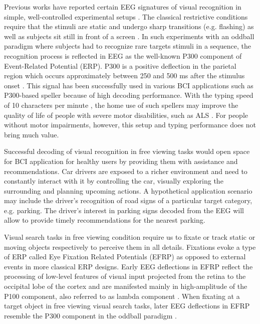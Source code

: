 \documentclass[12pt]{iopart}
\begin{document}
Previous works have reported certain EEG signatures of visual recognition in simple, well-controlled experimental setups
\cite{gerson_cortically_2006,krusienski_toward_2008,rosenthal_evoked_2014,jangraw_neurally_2014}.
The classical restrictive conditions require that
the stimuli are static and undergo sharp
transitions (e.g. flashing) as well as 
subjects sit still in front of a screen \cite{krusienski_toward_2008}. 
In such experiments with an oddball paradigm 
where subjects had to recognize
rare targets stimuli in a sequence, the recognition process
is reflected in EEG as the well-known P300 component of Event-Related Potential (ERP).
P300 is a positive deflection in the parietal region which occurs
approximately between 250 and 500 ms after the stimulus onset \cite{polich_updating_2007}.
This signal has been successfully used in various BCI applications such as
P300-based speller because of high decoding performance.
With the typing speed of 10 characters per minute \cite{rezeika_braincomputer_2018},
the home use of such spellers may improve the quality of life
of people with severe motor disabilities, such as ALS
\cite{sellers_brain-computer_2010,holz_long-term_2015,wolpaw_independent_2018}.
For people without motor impairments, however, this setup and typing performance does not bring much value.

Successful decoding of visual recognition in free viewing tasks
would open space for BCI application for healthy users
by providing them with assistance and recommendations.
Car drivers are exposed to a richer environment and need to constantly interact with it
by controlling the car, visually exploring the surrounding and
planning upcoming actions. 
A hypothetical application scenario may include
the driver's recognition of road signs of a particular target category, e.g. parking.
The driver's interest in parking signs decoded from the EEG
will allow to provide timely recommendations for the nearest parking.

Visual search tasks in free viewing condition require us to fixate or track static or moving objects respectively to perceive them in all details. Fixations evoke a type of ERP called Eye Fixation Related Potentials (EFRP)
as opposed to external events in more classical ERP designs.
Early EEG deflections in EFRP reflect the processing of low-level features 
of visual input projected from the retina to the occipital lobe of the cortex
and are manifested mainly in high-amplitude 
of the P100 component, also referred to as lambda component \cite{evans_further_1952}.
When fixating at a target object in free viewing visual search tasks, later EEG deflections in EFRP resemble the P300 component in the oddball paradigm \cite{brouwer_distinguishing_2013}.
\end{document}
